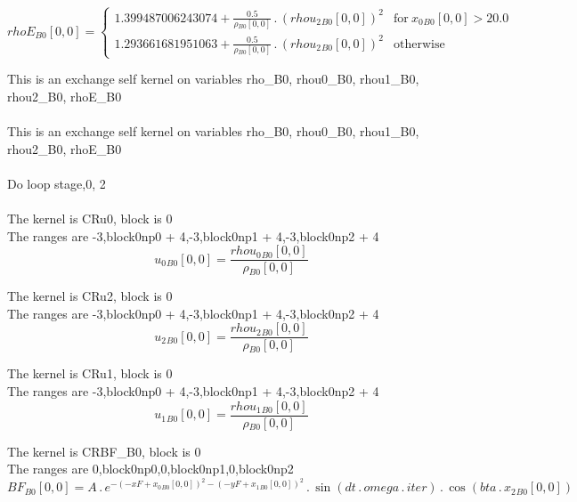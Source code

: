 \documentclass{article}
\begin{document}
\begin{dmath}{rhoE{_{B0}}}[{0,0}] = \begin{cases} 1.399487006243074 + \frac{0.5}{{\rho{_{B0}}}[{0,0}]} \,.\, \left({rhou_{2}{_{B0}}}[{0,0}] \right)^{2} & \text{for}\: {x_{0}{_{B0}}}[{0,0}] > 20.0 \\1.293661681951063 + \frac{0.5}{{\rho{_{B0}}}[{0,0}]} 
\,.\, \left({rhou_{2}{_{B0}}}[{0,0}] \right)^{2} & \text{otherwise} \end{cases}\end{dmath}

\noindent This is an exchange self kernel on variables rho_B0, rhou0_B0, rhou1_B0, rhou2_B0, rhoE_B0\\\\\noindent This is an exchange self kernel on variables rho_B0, rhou0_B0, rhou1_B0, rhou2_B0, rhoE_B0\\\\\noindent Do loop stage,0, 2\\
\\\noindent The kernel is CRu0, block is 0\\\noindent The ranges are -3,block0np0 + 4,-3,block0np1 + 4,-3,block0np2 + 4\\\begin{dmath}{u_{0}{_{B0}}}[{0,0}] = \frac{{rhou_{0}{_{B0}}}[{0,0}]}{{\rho{_{B0}}}[{0,0}]}\end{dmath}

\noindent The kernel is CRu2, block is 0\\\noindent The ranges are -3,block0np0 + 4,-3,block0np1 + 4,-3,block0np2 + 4\\\begin{dmath}{u_{2}{_{B0}}}[{0,0}] = \frac{{rhou_{2}{_{B0}}}[{0,0}]}{{\rho{_{B0}}}[{0,0}]}\end{dmath}

\noindent The kernel is CRu1, block is 0\\\noindent The ranges are -3,block0np0 + 4,-3,block0np1 + 4,-3,block0np2 + 4\\\begin{dmath}{u_{1}{_{B0}}}[{0,0}] = \frac{{rhou_{1}{_{B0}}}[{0,0}]}{{\rho{_{B0}}}[{0,0}]}\end{dmath}

\noindent The kernel is CRBF_B0, block is 0\\\noindent The ranges are 0,block0np0,0,block0np1,0,block0np2\\\begin{dmath}{BF{_{B0}}}[{0,0}] = A \,.\, e^{- \left(- xF + {x_{0}{_{B0}}}[{0,0}] \right)^{2} - \left(- yF + {x_{1}{_{B0}}}[{0,0}] \right)^{2}} \,.\, \sin{\left (dt \,.\, omega \,.\, iter \right )} \,.\, \cos{\left (bta \,.\, {x_{2}{_{B0}}}[{0,0}] 
\right )}\end{dmath}
\end{document}
